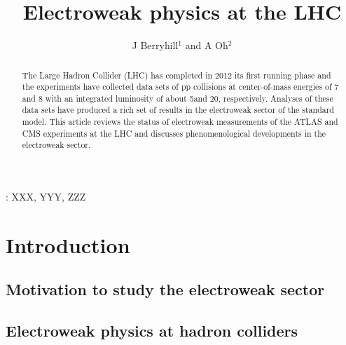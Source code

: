 \documentclass[12pt]{iopart}
\begin{document}
\title[Electroweak phyiscs at the LHC]{Electroweak physics at the LHC}
\author{J Berryhill$^1$ and A Oh$^2$}

\address{$^1$ Fermi National Accelerator Laboratory, Batavia, IL, USA}
\address{$^2$ School of Physics and Astronomy, University of Manchester, Manchester, UK}


\begin{abstract}
The Large Hadron Collider (LHC) has completed in 2012 its first
running phase and the experiments have collected data sets of pp
collisions at center-of-mass energies of 7 and 8 \TeV with an
integrated luminosity of about 5\ifb and 20\ifb, respectively.  Analyses
of these data sets have produced a rich set of results in the
electroweak sector of the standard model. This article reviews the
status of electroweak measurements of the ATLAS and CMS experiments at
the LHC and discusses phenomenological developments in the electroweak
sector.
\end{abstract}

%
\vspace{2pc}
: XXX, YYY, ZZZ
%
\submitto{\jpg}
%
\maketitle
% 
%


\section{Introduction}
\subsection{Motivation to study the electroweak sector}
\subsection{Electroweak physics at hadron colliders}
\end{document}
